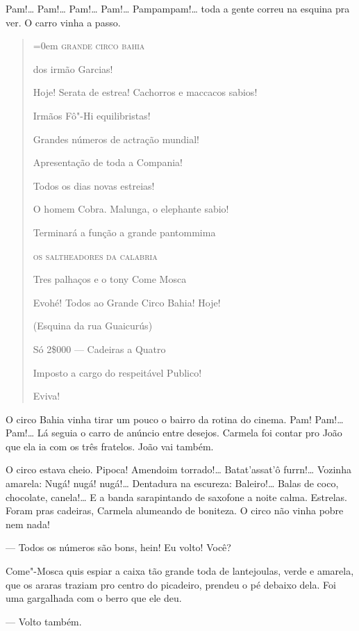 \begin{linenumbers}
Pam!\ldots{} Pam!\ldots{} Pam!\ldots{} Pam!\ldots{} Pampampam!\ldots{} toda a gente correu na
esquina pra ver. O carro vinha a passo.

\begin{quote}\parindent=0em
\textsc{grande circo bahia}

dos irmão Garcias!

Hoje! Serata de estrea! Cachorros e maccacos sabios!

Irmãos Fô"-Hi equilibristas!

Grandes números de actração mundial!

Apresentação de toda a Compania!

Todos os dias novas estreias!

O homem Cobra. Malunga, o elephante sabio!

Terminará a função a grande pantommima

\textsc{os saltheadores da calabria}

Tres palhaços e o tony Come Mosca

Evohé! Todos ao Grande Circo Bahia! Hoje!

(Esquina da rua Guaicurús)

Só 2\$000 --- Cadeiras a Quatro

Imposto a cargo do respeitável Publico!

Eviva!
\end{quote}

O circo Bahia vinha tirar um pouco o bairro da rotina do cinema. Pam!
Pam!\ldots{} Pam!\ldots{} Lá seguia o carro de anúncio entre desejos. Carmela foi
contar pro João que ela ia com os três fratelos. João vai também.

O circo estava cheio. Pipoca! Amendoim torrado!\ldots{} Batat'assat'ô
furrn!\ldots{} Vozinha amarela: Nugá! nugá! nugá!\ldots{} Dentadura na escureza:
Baleiro!\ldots{} Balas de coco, chocolate, canela!\ldots{} E a banda sarapintando
de saxofone a noite calma. Estrelas. Foram pras cadeiras, Carmela
alumeando de boniteza. O circo não vinha pobre nem nada!

--- Todos os números são bons, hein! Eu volto! Você?

Come"-Mosca quis espiar a caixa tão grande toda de lantejoulas, verde e
amarela, que os araras traziam pro centro do picadeiro, prendeu o pé
debaixo dela. Foi uma gargalhada com o berro que ele deu.

--- Volto também.


\end{linenumbers}

